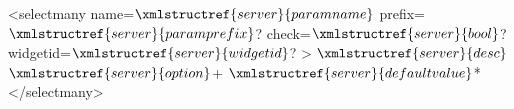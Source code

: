 <selectmany name=$\xmlstructref{server}{paramname}$ prefix=$\xmlstructref{server}{paramprefix}$? check=$\xmlstructref{server}{bool}$? widgetid=$\xmlstructref{server}{widgetid}$? >
  $\xmlstructref{server}{desc}$
  $\xmlstructref{server}{option}$+
  $\xmlstructref{server}{defaultvalue}$*
</selectmany>
